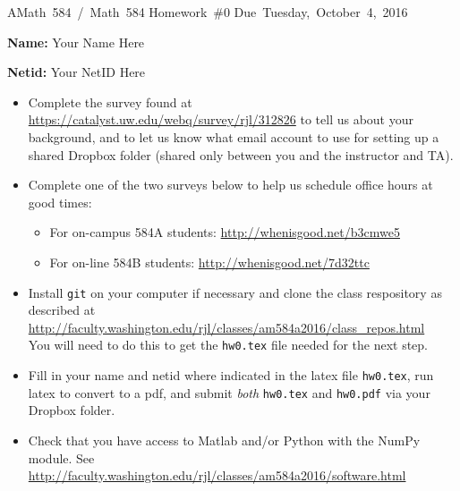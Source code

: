 \documentclass[10pt]{article}
\begin{document}
\hfill \vbox{
\hbox{AMath 584 / Math 584}
\hbox{Homework \#0}
\hbox{Due Tuesday, October 4, 2016}
}


\vskip 0.5cm

{\bf Name:}   Your Name Here

{\bf Netid:}  Your NetID Here

\vskip 1cm

\begin{itemize} 
\item Complete the survey found at
\url{https://catalyst.uw.edu/webq/survey/rjl/312826} 
to tell us about your background, and to let us know what email
account to use for setting up a shared Dropbox folder (shared only
between you and the instructor and TA).

\item Complete one of the two surveys below to help us schedule office hours
at good times:

    \begin{itemize} 
    \item For on-campus 584A students: \url{http://whenisgood.net/b3cmwe5}
    \item For on-line 584B students: \url{http://whenisgood.net/7d32ttc}
    \end{itemize} 

\item Install {\tt git} on your computer if necessary and clone the class
respository as described at \\
\url{http://faculty.washington.edu/rjl/classes/am584a2016/class_repos.html}\\  
You will need to do this to get the {\tt hw0.tex} file needed for the next step.

\item Fill in your name and netid where
indicated in the latex file {\tt hw0.tex}, run latex to 
convert to a pdf, and submit {\em both} {\tt hw0.tex} and {\tt hw0.pdf}
via your Dropbox folder.

\item Check that you have access to Matlab and/or Python with the NumPy
module.  See \\
\url{http://faculty.washington.edu/rjl/classes/am584a2016/software.html}\\

\end{itemize} 
\end{document}

